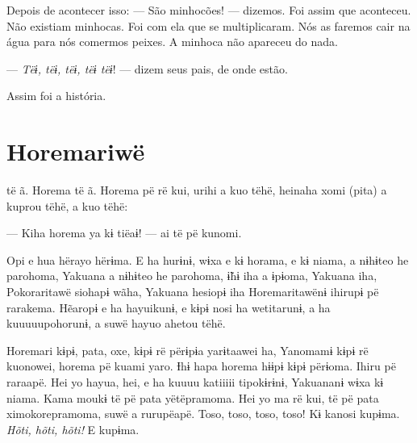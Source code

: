 Depois de acontecer isso: --- São minhocões! --- dizemos. Foi assim que aconteceu.
Não existiam minhocas. Foi com ela que se multiplicaram. Nós as faremos
cair na água para nós comermos peixes. A minhoca não apareceu do nada. 


--- \textit{Tëɨ, tëɨ, tëɨ, tëɨ tëɨ}! --- dizem seus pais, de onde estão. 

Assim foi a história.

\chapter{Horemariwë}

 të ã. Horema të ã. Horema pë rë kui, urihi a kuo tëhë, heinaha xomi
(pita) a kuprou tëhë, a kuo tëhë:

--- Kiha horema ya kɨ tiëaɨ! --- ai të pë kunomi. 



Opi e hua hërayo hërɨma. E ha hurɨnɨ, wɨxa e kɨ horama, e kɨ niama, a
nɨhɨteo he parohoma, Yakuana a nɨhɨteo he parohoma, ɨ̃hɨ iha a ɨpɨoma,
Yakuana iha, Pokoraritawë siohapɨ wãha, Yakuana hesiopɨ iha
Horemaritawënɨ ihirupɨ pë rarakema. Hẽaropɨ e ha hayuikunɨ, e kɨpɨ nosi
ha wetitarunɨ, a ha kuuuuupohorunɨ, a suwë hayuo ahetou tëhë. 

Horemari kɨpɨ, pata, oxe, kɨpɨ rë përɨpɨa yarɨtaawei ha, Yanomamɨ kɨpɨ
rë kuonowei, horema pë kuami yaro. Ɨhɨ hapa horema hɨɨpɨ kɨpɨ përɨoma.
Ihiru pë raraapë. Hei yo hayua, hei, e ha kuuuu katiiiii tipokɨrɨnɨ,
Yakuananɨ wɨxa kɨ niama. Kama moukɨ të pë pata yëtëpramoma. Hei yo ma rë
kui, të pë pata ximokorepramoma, suwë a rurupëapë. Toso, toso, toso,
toso! Kɨ kanosi kupɨma. \textit{Hõti, hõti, hõti!} E kupɨma. 

